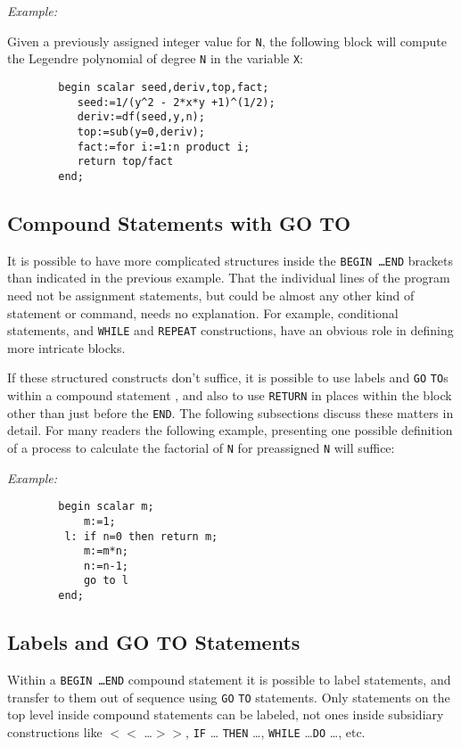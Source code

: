 {\it Example:}

Given a previously assigned integer value for {\tt N}, the following block
will compute the Legendre polynomial of degree {\tt N} in the variable
{\tt X}:
\begin{verbatim}
        begin scalar seed,deriv,top,fact;
           seed:=1/(y^2 - 2*x*y +1)^(1/2);
           deriv:=df(seed,y,n);
           top:=sub(y=0,deriv);
           fact:=for i:=1:n product i;
           return top/fact
        end;
\end{verbatim}

\subsection{Compound Statements with GO TO}

It is possible to have more complicated structures inside the {\tt BEGIN
\ldots END}  brackets than indicated in the
previous example.  That the individual lines of the program need not be
assignment  statements, but could be almost any other
kind of statement or command, needs no explanation.  For example,
conditional statements, and {\tt WHILE}  and {\tt REPEAT}
 constructions, have an obvious role in defining more
intricate blocks.

If these structured constructs don't suffice, it is possible to use labels
 and {\tt GO} {\tt TO}s within a compound
statement , and also to use
{\tt RETURN}  in places within the block other than just before
the {\tt END}.  The following subsections discuss these matters in detail.
For many readers the following example, presenting one possible definition
of a process to calculate the factorial of {\tt N} for preassigned {\tt N}
will suffice:

{\it Example:}
\begin{verbatim}
        begin scalar m;
            m:=1;
         l: if n=0 then return m;
            m:=m*n;
            n:=n-1;
            go to l
        end;
\end{verbatim}

\subsection{Labels and GO TO Statements}

 Within a {\tt BEGIN \ldots END} compound
statement it is possible to label statements, and transfer to them out of
sequence using {\tt GO} {\tt TO} statements.  Only statements on the top
level inside compound statements can be labeled, not ones inside
subsidiary constructions like {\tt $<<$} \ldots {\tt $>>$}, {\tt IF} \ldots
{\tt THEN} \ldots , {\tt WHILE} \ldots {\tt DO} \ldots , etc.


